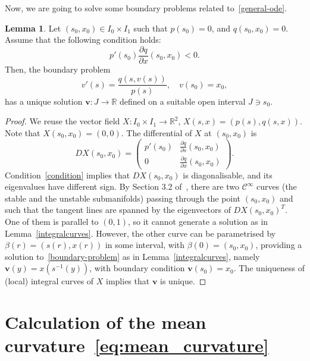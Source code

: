 \documentclass[oneside,12pt]{amsart}
\theoremstyle{definition}
\newtheorem{lemma}{Lemma}
\newcommand{\R}{\mathbb{R}}
\newcommand{\vv}{\mathbf{v}}
\begin{document}
Now, we are going to solve some boundary problems related to~\eqref{general-ode}.
\begin{lemma}\label{boundarysol} Let $(s_0,x_0)\in I_0\times I_1$ such that $p(s_0)=0$, and $q(s_0,x_0)=0$. Assume that the following condition holds:
\begin{equation} \label{condition} p'(s_0)\frac{\partial q}{\partial x}(s_0,x_0)<0. \end{equation}
Then, the boundary problem
\begin{equation}\label{boundary-problem}
v'(s)=\frac{q(s,v(s))}{p(s)}, \quad v(s_0)=x_0,
\end{equation} has a unique solution $\vv:J\to\R$ defined on a suitable open interval $J \ni s_0$.
\end{lemma}
\begin{proof} We reuse the vector field $X:I_0\times I_1\to\R^2$, $X(s,x)=(p(s),q(s,x))$.
Note that $X(s_0,x_0)=(0,0)$. The differential of $X$ at $(s_0,x_0)$ is
\[ DX(s_0,x_0)=\begin{pmatrix} p'(s_0) & \frac{\partial q}{\partial s}(s_0,x_0)  \\ 0 &
\frac{\partial q}{\partial x}(s_0,x_0)
\end{pmatrix}.\]
Condition~\eqref{condition} implies that $DX(s_0,x_0)$ is diagonalisable, and its eigenvalues have different sign. By Section 3.2 of~\cite{W2003}, there are two $\mathcal{C}^{\infty}$ curves (the stable and the unstable submanifolds) passing through the point  $(s_0,x_0)$ and such that the tangent lines are spanned by the eigenvectors of $DX(s_0,x_0)^T$. One of them is parallel to $(0,1)$, so it cannot generate a solution as in Lemma~\ref{integralcurves}. However, the other curve can be parametrised by  $\beta(r)=(s(r),x(r))$ in some interval, with  $\beta(0)=(s_0,x_0)$, providing a solution to~\eqref{boundary-problem} as in Lemma~\ref{integralcurves}, namely  $\vv(y)=x(s^{-1}(y))$, with boundary condition $\vv(s_0)=x_0$. The uniqueness of (local) integral curves of $X$ implies that $\vv$ is unique.
\end{proof}

\section{Calculation of the mean curvature~\eqref{eq:mean_curvature} } \label{appendix:mean_curvature}
\end{document}
